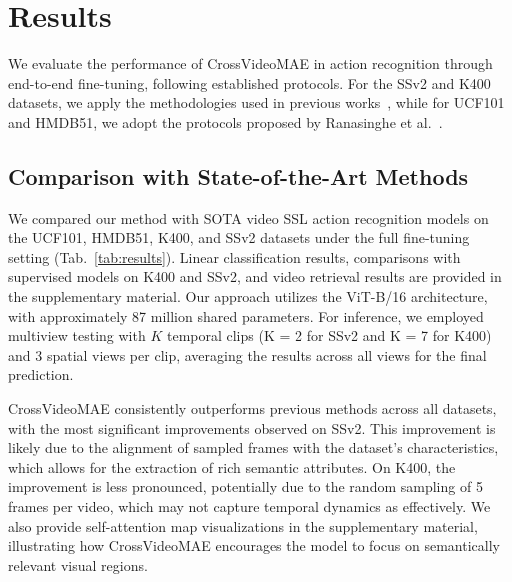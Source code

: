 \section{Results}
\label{sec:results}

We evaluate the performance of CrossVideoMAE in action recognition through end-to-end fine-tuning, following established protocols. For the SSv2 and K400 datasets, we apply the methodologies used in previous works~\cite{bao2022beit,he2022masked,feichtenhofer2022masked}, while for UCF101 and HMDB51, we adopt the protocols proposed by Ranasinghe et al.~\cite{ranasinghe2022self}.


\subsection{Comparison with State-of-the-Art Methods}
We compared our method with SOTA video SSL action recognition models on the UCF101, HMDB51, K400, and SSv2 datasets under the full fine-tuning setting (Tab.~\ref{tab:results}). Linear classification results, comparisons with supervised models on K400 and SSv2, and video retrieval results are provided in the supplementary material. Our approach utilizes the ViT-B/16 architecture, with approximately 87 million shared parameters. For inference, we employed multiview testing with \( K \) temporal clips (K = 2 for SSv2 and K = 7 for K400) and 3 spatial views per clip, averaging the results across all views for the final prediction.

CrossVideoMAE consistently outperforms previous methods across all datasets, with the most significant improvements observed on SSv2. This improvement is likely due to the alignment of sampled frames with the dataset's characteristics, which allows for the extraction of rich semantic attributes. On K400, the improvement is less pronounced, potentially due to the random sampling of 5 frames per video, which may not capture temporal dynamics as effectively. We also provide self-attention map visualizations in the supplementary material, illustrating how CrossVideoMAE encourages the model to focus on semantically relevant visual regions.


